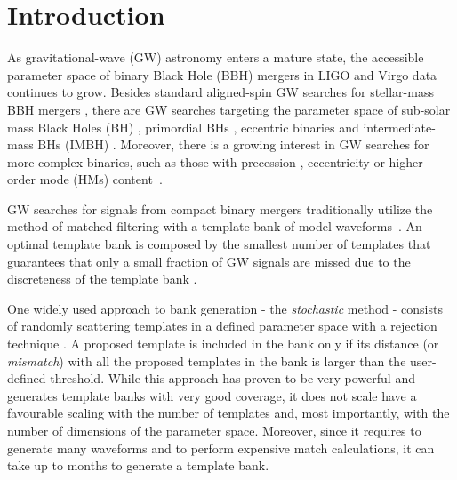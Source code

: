 \documentclass[twocolumn,showpacs,preprintnumbers,nofootinbib,prd,
superscriptaddress,10pt]{revtex4-2}
\begin{document}
\section{Introduction}

As gravitational-wave (GW) astronomy enters a mature state, the accessible parameter space of binary Black Hole (BBH) mergers in LIGO \cite{LIGOScientific:2014pky} and Virgo \cite{VIRGO:2014yos} data continues to grow. Besides standard aligned-spin GW searches for stellar-mass BBH mergers \cite{GWTC-1,GWTC-2,GWTC-2.1, GWTC-3}, there are GW searches targeting the parameter space of sub-solar mass Black Holes (BH) \cite{SSM_O2, SSM_O3a, PhysRevD.106.023024, Nitz:2021mzz}, primordial BHs \cite{PBH}, eccentric binaries \cite{PhysRevD.102.043005, PhysRevD.104.104016, Nitz:2019spj} and intermediate-mass BHs (IMBH) \cite{IMBH_O2, IMBH_O3, Chandra:2022ixv}. Moreover, there is a growing interest in GW searches for more complex binaries, such as those with precession \cite{PhysRevD.89.024010, Harry:2017weg, PhysRevD.102.041302, Indik:2016qky, Harry:2016ijz}, eccentricity \cite{LIGOScientific:2019dag, Ramos-Buades:2020eju, Wang:2021qsu, Nitz:2021mzz} or higher-order mode (HMs) content~\cite{CalderonBustillo:2015lrt, Harry:2017weg, Chandra_hom, 2021PhRvD.103b4042M}.

GW searches for signals from compact binary mergers traditionally utilize the method of matched-filtering with a template bank of model waveforms~\cite{Sathyaprakash:1991mt, Dhurandhar:1992mw, Owen:1998dk, Allen:2005fk, Babak:2006ty, Cokelaer:2007mv}.
An optimal template bank is composed by the smallest number of templates that guarantees that only a small fraction of GW signals are missed due to the discreteness of the template bank \cite{Prix:2007ks}.

One widely used approach to bank generation - the {\it stochastic} method \cite{Harry:2009ea, PhysRevD.80.104014, Ajith:2012mn} - consists of randomly scattering templates in a defined parameter space with a rejection technique \cite{DalCanton:2017ala, Mukherjee:2018yra, Indik:2016qky, Lenon:2021zac}. A proposed template is included in the bank only if its distance (or {\it mismatch}) with all the proposed templates in the bank is larger than the user-defined threshold.
While this approach has proven to be very powerful and generates template banks with very good coverage, it does not scale have a favourable scaling with the number of templates and, most importantly, with the number of dimensions of the parameter space.
Moreover, since it requires to generate many waveforms and to perform expensive match calculations, it can take up to months to generate a template bank.
\end{document}
